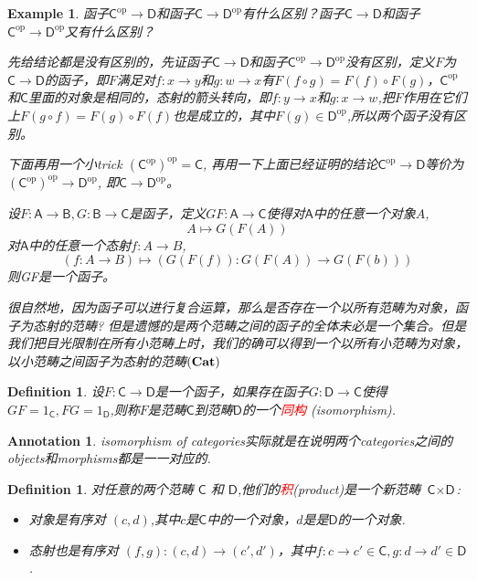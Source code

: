 \documentclass{article}
\newtheorem{example}[theorem]{Example}
\newtheorem{definition}[theorem]{Definition}
\newtheorem{annotation}[theorem]{Annotation}
\newcommand*{\cat}[1]{\textsf{#1}\xspace}
\newcommand{\sC}{\mathsf{C}}
\newcommand{\sD}{\mathsf{D}}
\newcommand{\op}{\textrm{op}}
\newcommand*{\xfunc}[4]{{#2}\colon{#3}{#1}{#4}}
\newcommand*{\func}[3]{\xfunc{\to}{#1}{#2}{#3}}
\newcommand{\redt}[1]{\textcolor{red}{#1}}
\begin{document}
\begin{example}
\rm 函子$\sC^{\op}\to \sD$和函子$\sC\to \sD^{\op}$有什么区别？函子$\sC\to\sD$和函子$\sC^{\op}\to \sD^{\op}$又有什么区别？

先给结论都是没有区别的，先证函子$\sC\to\sD$和函子$\sC^{\op}\to \sD^{\op}$没有区别，定义$F$为$\sC\to\sD$的函子，即$F$满足对$\func{f}{x}{y}$和$\func{g}{w}{x}$有$F(f \circ g)=F(f) \circ F(g)$，$\sC^{\op}$和$\sC$里面的对象是相同的，态射的箭头转向，即$\func{f}{y}{x}$和$\func{g}{x}{w}$,把$F$作用在它们上$F(g \circ f)=F(g) \circ F(f)$也是成立的，其中$F(g) \in \sD^{\op}$,所以两个函子没有区别。

下面再用一个小trick $({\sC^{\op}})^{\op}=\sC$, 再用一下上面已经证明的结论$\sC^{\op}\to\sD$等价为$({\sC^{\op}})^{\op}\to\sD^{\op}$, 即$\sC\to\sD^{\op}$。

设$F \colon \cat{A} \rightarrow \cat{B},G \colon \cat{B} \rightarrow \cat{C}$是函子，定义$GF \colon \cat{A} \rightarrow \cat{C}$使得对$\cat{A}$中的任意一个对象$A$,\[A \mapsto G(F(A))\]
对$\cat{A}$中的任意一个态射$f \colon A \rightarrow B$, \[(f \colon A \rightarrow B) \mapsto (G(F(f)) \colon G(F(A)) \rightarrow G(F(b))) \]则GF是一个函子。

很自然地，因为函子可以进行复合运算，那么是否存在一个以所有范畴为对象，函子为态射的范畴? 但是遗憾的是两个范畴之间的函子的全体未必是一个集合。但是我们把目光限制在所有小范畴上时，我们的确可以得到一个以所有小范畴为对象，以小范畴之间函子为态射的范畴$\bf(Cat)$

\end{example}

\begin{definition}
\rm 设$F \colon \cat{C} \rightarrow \cat{D}$是一个函子，如果存在函子$G \colon \cat{D} \rightarrow \cat{C}$使得$GF=1_{\cat{C}},FG = 1_{\cat{D}}$,则称$F$是范畴$\cat{C}$到范畴$\cat{D}$的一个\redt{同构} (isomorphism).
\end{definition}

\begin{annotation}
\rm  isomorphism of categories实际就是在说明两个categories之间的objects和morphisms都是一一对应的. 
\end{annotation}


\begin{definition}
\rm 对任意的两个范畴 $\cat{C}$ 和 $\cat{D}$,他们的\redt{积}(product)是一个新范畴 $\cat{C} \times \cat{D}$:
\begin{itemize}
	\item 对象是有序对 $\left(c,d \right)$,其中$c$是$\cat{C}$中的一个对象，$d$是是$\cat{D}$的一个对象.
	\item 态射也是有序对 $\left(f,g \right) \colon \left(c,d\right) \rightarrow \left(c',d'\right)$，其中$f\colon c \rightarrow c' \in \cat{C}, g \colon d \rightarrow d' \in \cat{D}$.
\end{itemize}
\end{definition}
\end{document}
